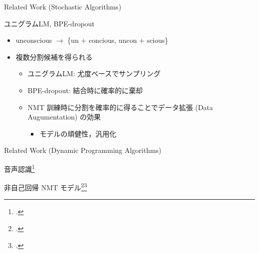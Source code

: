 \documentclass[unicode, 12pt, aspectratio=43]{beamer}
\begin{document}
\begin{frame}[label={sec:org9d527b6}]{Related Work (Stochastic Algorithms)}
\begin{block}{ユニグラムLM, BPE-dropout}
\begin{itemize}
\item \footnotesize unconscious \(\rightarrow\) \{un + concious, uncon + scious\}
\item \normalsize 複数分割候補を得られる
\begin{itemize}
\item ユニグラムLM: 尤度ベースでサンプリング
\item BPE-dropout: 結合時に確率的に棄却
\item NMT 訓練時に分割を確率的に得ることでデータ拡張 (Data Augumentation) の効果
\begin{itemize}
\item モデルの頑健性，汎用化
\end{itemize}
\end{itemize}
\end{itemize}
\end{block}
\end{frame}

\begin{frame}[label={sec:org2ef88b0}]{\normalsize Related Work (Dynamic Programming Algorithms)}
\begin{block}{音声認識\footcite{wang-etal-2017-sequence}}
\end{block}

\begin{block}{非自己回帰 NMT モデル\footcite{chan-etal-2020-imputer}\footcite{saharia-etal-2020-nonautoregressive}}
\end{block}
\end{frame}
\end{document}
